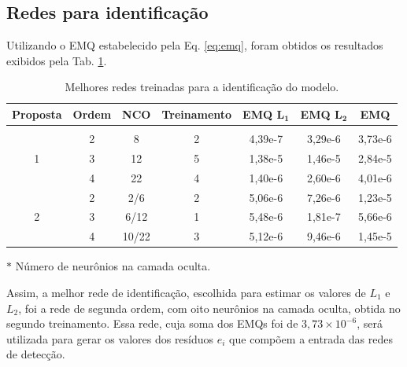 \subsection{Redes para identificação}
Utilizando o EMQ estabelecido pela Eq. \ref{eq:emq}, foram obtidos os resultados
exibidos pela Tab. \ref{tab:melhores_rnas_ident}.

\begin{table}[htb]
\small
\centering
\caption{Melhores redes treinadas para a identificação do modelo.}
\label{tab:melhores_rnas_ident}
\vspace{0.25cm}
\begin{threeparttable}
\begin{tabular}{|c|c|c|c|c|c|c|}
\hline
{\bf Proposta} & 
{\bf Ordem} & 
{\bf NCO\tnote{$*$}} & 
{\bf Treinamento} &
{\bf EMQ $\mathbf{L_1}$} & 
{\bf EMQ $\mathbf{L_2}$} & 
{\bf EMQ}\\
\hline
\hhline\\
\multirow{3}{*}{1} &
\cellcolor[gray]{0.85}2 &
\cellcolor[gray]{0.85}8 &
\cellcolor[gray]{0.85}2 &
\cellcolor[gray]{0.85}4,39e-7 &
\cellcolor[gray]{0.85}3,29e-6 &
\cellcolor[gray]{0.85}3,73e-6\\
\hhline{~------}
&3 & 12 & 5 & 1,38e-5 & 1,46e-5 & 2,84e-5\\
\cline{2-7}
&4 & 22 & 4 & 1,40e-6 & 2,60e-6 & 4,01e-6\\
\hline
\multirow{3}{*}{2} & 2 & 2/6 & 2 & 5,06e-6 & 7,26e-6 & 1,23e-5\\
\cline{2-7}
& 3 & 6/12 & 1 & 5,48e-6 & 1,81e-7 & 5,66e-6\\
\cline{2-7}
& 4 & 10/22 & 3 & 5,12e-6 & 9,46e-6 & 1,45e-5\\
\hline
\end{tabular}
\begin{tablenotes}
\item [$*$] Número de neurônios na camada oculta.
\end{tablenotes}
\end{threeparttable}
\end{table}

Assim, a melhor rede de identificação, escolhida para estimar os valores de
$L_1$ e $L_2$, foi a rede de segunda ordem, com oito neurônios na camada oculta,
obtida no segundo treinamento. Essa rede, cuja soma dos EMQs foi de $3,73 \times
10^{-6}$, será utilizada para gerar os valores dos resíduos $e_i$
que compõem a entrada das redes de detecção.

